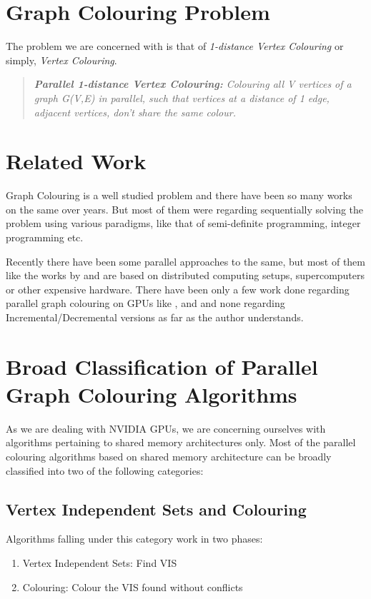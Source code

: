 \documentclass[MTech]{iitmdiss}
\begin{document}
\section{Graph Colouring Problem}
The problem we are concerned with is that of \textit{1-distance Vertex Colouring} or simply, \textit{Vertex Colouring}.
\begin{verse}
\textit{\textbf{Parallel 1-distance Vertex Colouring:} Colouring all \textit{V} vertices of a graph \textit{G(V,E)} in parallel, such that vertices at a distance of 1 edge, adjacent vertices, don't share the same colour.}
\end{verse}
\section{Related Work}
Graph Colouring is a well studied problem and there have been so many works on the same over years. But most of them were regarding sequentially solving the problem using various paradigms, like that of semi-definite programming, integer programming etc.

Recently there have been some parallel approaches to the same, but most of them like the works by \citet{journals/jpdc/BozdagGMBC08, DBLP:conf/hpcc/BozdagCGMBO05} and \citet{CAtalyuRek:2012:GCA:2396901.2397093} are based on distributed computing setups, supercomputers or other expensive hardware. There have been only a few work done regarding parallel graph colouring on GPUs like \citet{Grosset:2011:EGC:2038037.1941597}, \citet{nvidia:naumov} and \citet{6828158} and none regarding Incremental/Decremental versions as far as the author understands.
\section{Broad Classification of Parallel Graph Colouring Algorithms}
As we are dealing with NVIDIA GPUs, we are concerning ourselves with algorithms pertaining to shared memory architectures only. Most of the parallel colouring algorithms based on shared memory architecture can be broadly classified into two of the following categories:
\subsection{Vertex Independent Sets and Colouring}
Algorithms falling under this category work in two phases:
\begin{enumerate}
\item Vertex Independent Sets: Find VIS
\item Colouring: Colour the VIS found without conflicts
\end{enumerate}
\end{document}
